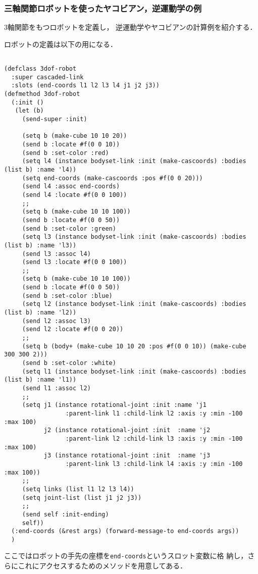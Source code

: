 \subsubsection{三軸関節ロボットを使ったヤコビアン，逆運動学の例}

3軸関節をもつロボットを定義し，
逆運動学やヤコビアンの計算例を紹介する．

ロボットの定義は以下の用になる．
{\baselineskip=10pt
\begin{verbatim}

(defclass 3dof-robot
  :super cascaded-link
  :slots (end-coords l1 l2 l3 l4 j1 j2 j3))
(defmethod 3dof-robot
  (:init ()
   (let (b)
     (send-super :init)

     (setq b (make-cube 10 10 20))
     (send b :locate #f(0 0 10))
     (send b :set-color :red)
     (setq l4 (instance bodyset-link :init (make-cascoords) :bodies (list b) :name 'l4))
     (setq end-coords (make-cascoords :pos #f(0 0 20)))
     (send l4 :assoc end-coords)
     (send l4 :locate #f(0 0 100))
     ;;
     (setq b (make-cube 10 10 100))
     (send b :locate #f(0 0 50))
     (send b :set-color :green)
     (setq l3 (instance bodyset-link :init (make-cascoords) :bodies (list b) :name 'l3))
     (send l3 :assoc l4)
     (send l3 :locate #f(0 0 100))
     ;;
     (setq b (make-cube 10 10 100))
     (send b :locate #f(0 0 50))
     (send b :set-color :blue)
     (setq l2 (instance bodyset-link :init (make-cascoords) :bodies (list b) :name 'l2))
     (send l2 :assoc l3)
     (send l2 :locate #f(0 0 20))
     ;;
     (setq b (body+ (make-cube 10 10 20 :pos #f(0 0 10)) (make-cube 300 300 2)))
     (send b :set-color :white)
     (setq l1 (instance bodyset-link :init (make-cascoords) :bodies (list b) :name 'l1))
     (send l1 :assoc l2)
     ;;
     (setq j1 (instance rotational-joint :init :name 'j1
                 :parent-link l1 :child-link l2 :axis :y :min -100 :max 100)
           j2 (instance rotational-joint :init  :name 'j2
                 :parent-link l2 :child-link l3 :axis :y :min -100 :max 100)
           j3 (instance rotational-joint :init  :name 'j3
                 :parent-link l3 :child-link l4 :axis :y :min -100 :max 100))
     ;;
     (setq links (list l1 l2 l3 l4))
     (setq joint-list (list j1 j2 j3))
     ;;
     (send self :init-ending)
     self))
  (:end-coords (&rest args) (forward-message-to end-coords args))
  )
\end{verbatim}
}

ここではロボットの手先の座標を\verb|end-coords|というスロット変数に格
納し，さらにこれにアクセスするためのメソッドを用意してある．

